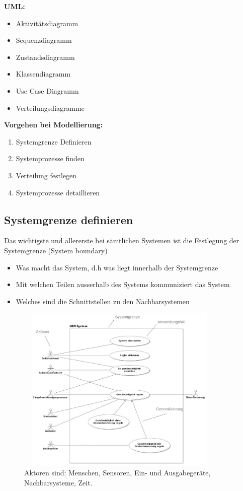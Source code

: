 \begin{multicols}{2}
	\textbf{UML:}
	\begin{itemize}
		\item Aktivitätsdiagramm
		\item Sequenzdiagramm
		\item Zustandsdiagramm
		\item Klassendiagramm
		\item Use Case Diagramm
		\item Verteilungsdiagramme
	\end{itemize}
	\columnbreak
	
	\textbf{Vorgehen bei Modellierung:}
	\begin{enumerate}
		\item Systemgrenze Definieren
		\item Systemprozesse finden
		\item Verteilung festlegen
		\item Systemprozesse detaillieren
	\end{enumerate}
\end{multicols}

\subsection{Systemgrenze definieren }
Das wichtigste und allererste bei sämtlichen Systemen ist die Festlegung der Systemgrenze (System boundary)
\begin{itemize}
	\item Was macht das System, d.h was liegt innerhalb der Systemgrenze
	\item Mit welchen Teilen ausserhalb des Systems kommuniziert das System
	\item Welches sind die Schnittstellen zu den Nachbarsystemen
\end{itemize}

\begin{figure}[h]
	\centering
	\includegraphics[height=8cm, width = 10cm,]{images/Modellierung/Systemgrenze}
	\caption{Aktoren sind: Menschen, Sensoren, Ein- und Ausgabegeräte, Nachbarsysteme, Zeit.}
\end{figure}


